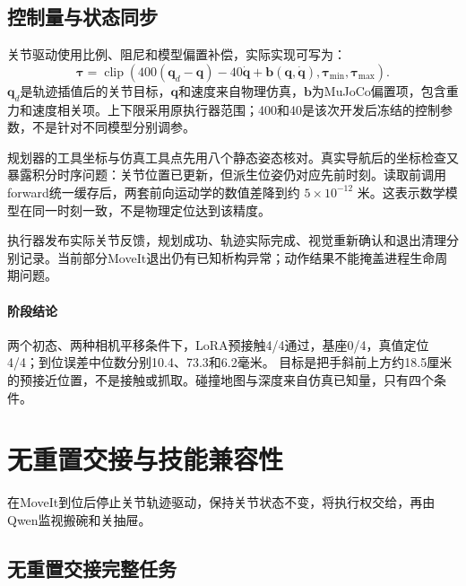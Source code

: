 \subsection{控制量与状态同步}\label{s19-detail-6}

关节驱动使用比例、阻尼和模型偏置补偿，实际实现可写为： \[\boldsymbol\tau=\operatorname{clip}\left(400(\boldsymbol q_d-\boldsymbol q)-40\dot{\boldsymbol q}+\boldsymbol b(\boldsymbol q,\dot{\boldsymbol q}),\boldsymbol\tau_{\min},\boldsymbol\tau_{\max}\right).\] \(\boldsymbol q_d\)是轨迹插值后的关节目标，\(\boldsymbol q\)和速度来自物理仿真，\(\boldsymbol b\)为MuJoCo偏置项，包含重力和速度相关项。上下限采用原执行器范围；400和40是该次开发后冻结的控制参数，不是针对不同模型分别调参。

规划器的工具坐标与仿真工具点先用八个静态姿态核对。真实导航后的坐标检查又暴露积分时序问题：关节位置已更新，但派生位姿仍对应先前时刻。读取前调用forward统一缓存后，两套前向运动学的数值差降到约 \(5\times10^{-12}\) 米。这表示数学模型在同一时刻一致，不是物理定位达到该精度。

执行器发布实际关节反馈，规划成功、轨迹实际完成、视觉重新确认和退出清理分别记录。当前部分MoveIt退出仍有已知析构异常；动作结果不能掩盖进程生命周期问题。


\paragraph{阶段结论}两个初态、两种相机平移条件下，LoRA预接触4/4通过，基座0/4，真值定位4/4；到位误差中位数分别10.4、73.3和6.2毫米。 目标是把手斜前上方约18.5厘米的预接近位置，不是接触或抓取。碰撞地图与深度来自仿真已知量，只有四个条件。


\FloatBarrier

\section{无重置交接\pifive{}与技能兼容性}

\label{stage:s20}

在MoveIt到位后停止关节轨迹驱动，保持关节状态不变，将执行权交给\pifive{}，再由Qwen监视搬碗和关抽屉。

\subsection{无重置交接完整任务}\label{s20-detail-1}

